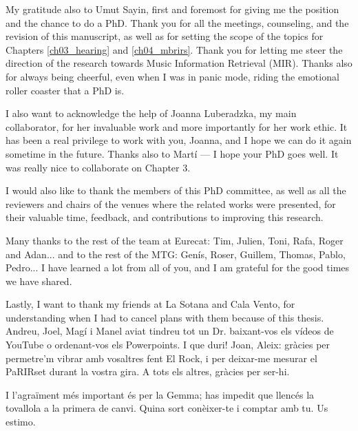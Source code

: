 My gratitude also to Umut Sayin, first and foremost for giving me the position and the chance to do a PhD. Thank you for all the meetings, counseling, and the revision of this manuscript, as well as for setting the scope of the topics for Chapters \ref{ch03_hearing} and \ref{ch04_mbrirs}. Thank you for letting me steer the direction of the research towards Music Information Retrieval (MIR). Thanks also for always being cheerful, even when I was in panic mode, riding the emotional roller coaster that a PhD is.

I also want to acknowledge the help of Joanna Luberadzka, my main collaborator, for her invaluable work and more importantly for her work ethic. It has been a real privilege to work with you, Joanna, and I hope we can do it again sometime in the future. Thanks also to Martí --- I hope your PhD goes well. It was really nice to collaborate on Chapter 3. 

I would also like to thank the members of this PhD committee, as well as all the reviewers and chairs of the venues where the related works were presented, for their valuable time, feedback, and contributions to improving this research.

Many thanks to the rest of the team at Eurecat: Tim, Julien, Toni, Rafa, Roger and Adan... and to the rest of the MTG: Genís, Roser, Guillem, Thomas, Pablo, Pedro... I have learned a lot from all of you, and I am grateful for the good times we have shared. 

Lastly, I want to thank my friends at La Sotana and Cala Vento, for understanding when I had to cancel plans with them because of this thesis. Andreu, Joel, Magí i Manel aviat tindreu tot un Dr. baixant-vos els vídeos de YouTube o ordenant-vos els Powerpoints. I que duri! Joan, Aleix: gràcies per permetre'm vibrar amb vosaltres fent El Rock, i per deixar-me mesurar el PaRIRset durant la vostra gira. A tots els altres, gràcies per ser-hi. 

I l'agraïment més important és per la Gemma; has impedit que llencés la tovallola a la primera de canvi. Quina sort conèixer-te i comptar amb tu. Us estimo.
